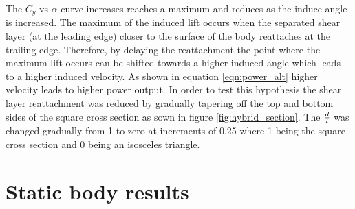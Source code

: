 The $C_y$ vs $\alpha$ curve increases reaches a maximum and reduces as the induce angle is increased. The maximum of the induced lift occurs when the separated  shear layer (at the leading edge) closer to the surface of the body reattaches at the trailing edge. Therefore, by delaying the reattachment the point where the maximum lift occurs can be shifted towards a higher induced angle which leads to a higher induced velocity. As shown in equation \ref{eqn:power_alt} higher velocity leads to higher power output. In order to test this hypothesis the shear layer reattachment was reduced by gradually tapering off the top and bottom sides of the square cross section as sown in figure \ref{fig:hybrid_section}. The $\frac{d}{l}$ was changed gradually from 1 to zero at increments of 0.25 where 1 being the square cross section and 0 being an isosceles triangle.    



\section{Static body results}











